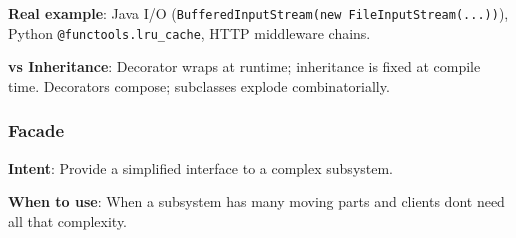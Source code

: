 \documentclass[11pt]{article}
\begin{document}
\textbf{Real example}: Java I/O (\texttt{BufferedInputStream(new\ FileInputStream(...))}), Python \texttt{@functools.lru\_cache}, HTTP middleware chains.

\textbf{vs Inheritance}: Decorator wraps at runtime; inheritance is fixed at compile time. Decorators compose; subclasses explode combinatorially.

\subsubsection{Facade}\label{facade}

\textbf{Intent}: Provide a simplified interface to a complex subsystem.

\textbf{When to use}: When a subsystem has many moving parts and clients don\textquotesingle t need all that complexity.

\end{document}
